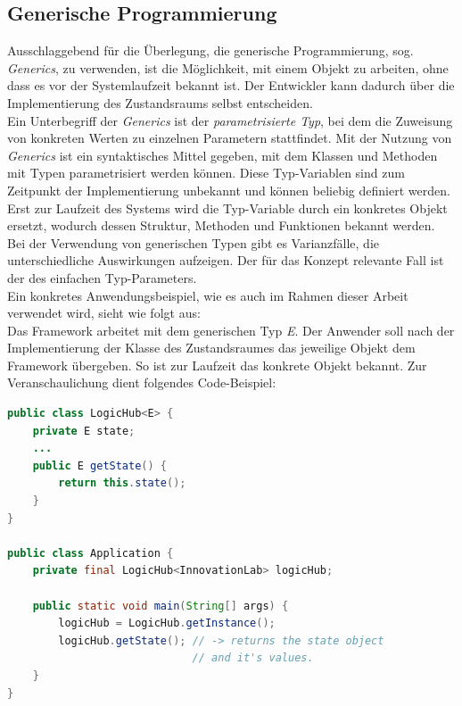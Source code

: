 \subsection{Generische Programmierung} %
\label{subsec:java_generics}
    Ausschlaggebend für die Überlegung, die generische Programmierung, sog. \textit{Generics}, zu verwenden, ist die Möglichkeit, mit einem Objekt 
    zu arbeiten, ohne dass es vor der Systemlaufzeit bekannt ist. Der Entwickler kann dadurch über die Implementierung des Zustandsraums selbst entscheiden. 
    \\
    \linebreak
    Ein Unterbegriff der \textit{Generics} ist der \textit{parametrisierte Typ}, bei dem die Zuweisung von konkreten Werten zu einzelnen Parametern 
    stattfindet. Mit der Nutzung von \textit{Generics} ist ein syntaktisches Mittel 
    gegeben, mit dem Klassen und Methoden mit Typen parametrisiert werden können. Diese Typ-Variablen sind zum 
    Zeitpunkt der Implementierung unbekannt und können beliebig definiert werden. Erst zur Laufzeit des Systems 
    wird die Typ-Variable durch ein konkretes Objekt ersetzt, wodurch dessen Struktur, Methoden und Funktionen bekannt 
    werden. Bei der Verwendung von generischen Typen gibt es 
    Varianzfälle, die unterschiedliche Auswirkungen aufzeigen. Der für das Konzept relevante Fall ist der des 
    einfachen Typ-Parameters. 
    \\
    \linebreak
    Ein konkretes Anwendungsbeispiel, wie es 
    auch im Rahmen dieser Arbeit verwendet wird, sieht wie folgt aus:
    \\
    Das Framework arbeitet mit dem generischen Typ \textit{E}. Der Anwender soll nach der Implementierung der Klasse des Zustandsraumes das 
    jeweilige Objekt dem Framework übergeben. So ist zur Laufzeit das konkrete Objekt bekannt. Zur Veranschaulichung dient folgendes Code-Beispiel:
\begin{lstlisting}[language=Java, frame=lines, xleftmargin=\parindent, style=algoBericht, label={code:generics}, captionpos=b, caption={Zustandsobjekt als Typ-Variable}]
public class LogicHub<E> {
    private E state;
    ...
    public E getState() {
        return this.state();
    }
}

public class Application {
    private final LogicHub<InnovationLab> logicHub;

    public static void main(String[] args) {
        logicHub = LogicHub.getInstance();
        logicHub.getState(); // -> returns the state object 
                             // and it's values.
    }
}
\end{lstlisting}
